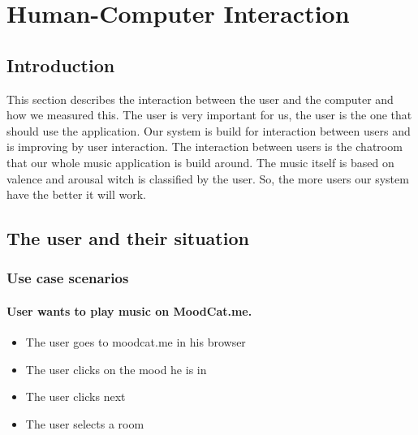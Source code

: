 \chapter{Human-Computer Interaction}

\section{Introduction}
This section describes the interaction between the user and the computer and how we measured this.
The user is very important for us, the user is the one that should use the application.
Our system is build for interaction between users and is improving by user interaction.
The interaction between users is the chatroom that our whole music application is build around.
The music itself is based on valence and arousal witch is classified by the user.
So, the more users our system have the better it will work.




\section{The user and their situation}


\subsection{Use case scenarios}

\subsubsection{User wants to play music on MoodCat.me.}
\begin{itemize}
\item The user goes to moodcat.me in his browser
\item The user clicks on the mood he is in
\item The user clicks next
\item The user selects a room
\end{itemize}

